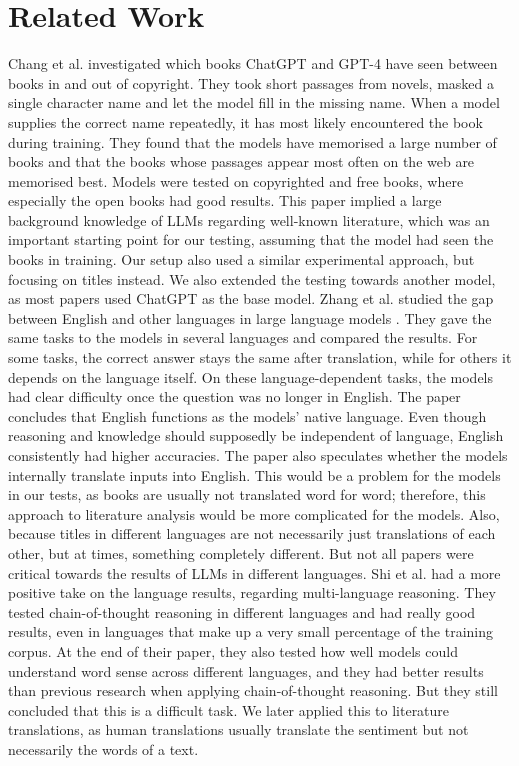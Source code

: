 \documentclass[11pt]{article}
\begin{document}
\section{Related Work}
Chang et al. investigated which books ChatGPT and GPT-4 have seen between books in and out of copyright\cite{chang2023}. They took short passages from novels, masked a single character name and let the model fill in the missing name. When a model supplies the correct name repeatedly, it has most likely encountered the book during training. They found that the models have memorised a large number of books and that the books whose passages appear most often on the web are memorised best. Models were tested on copyrighted and free books, where especially the open books had good results. This paper implied a large background knowledge of LLMs regarding well-known literature, which was an important starting point for our testing, assuming that the model had seen the books in training. Our setup also used a similar experimental approach, but focusing on titles instead. We also extended the testing towards another model,  as most papers used ChatGPT as the base model.
Zhang et al. studied the gap between English and other languages in large language models \cite{zhang2023}. They gave the same tasks to the models in several languages and compared the results. For some tasks, the correct answer stays the same after translation, while for others it depends on the language itself. On these language-dependent tasks, the models had clear difficulty once the question was no longer in English. The paper concludes that English functions as the models' native language. Even though reasoning and knowledge should supposedly be independent of language, English consistently had higher accuracies. The paper also speculates whether the models internally translate inputs into English. This would be a problem for the models in our tests, as books are usually not translated word for word; therefore, this approach to literature analysis would be more complicated for the models. Also, because titles in different languages are not necessarily just translations of each other, but at times, something completely different. 
But not all papers were critical towards the results of LLMs in different languages. Shi et al. had a more positive take on the language results, regarding multi-language reasoning\cite{shi2022}. They tested chain-of-thought reasoning in different languages and had really good results, even in languages that make up a very small percentage of the training corpus. At the end of their paper, they also tested how well models could understand word sense across different languages, and they had better results than previous research when applying chain-of-thought reasoning. But they still concluded that this is a difficult task. We later applied this to literature translations, as human translations usually translate the sentiment but not necessarily the words of a text.
\end{document}
